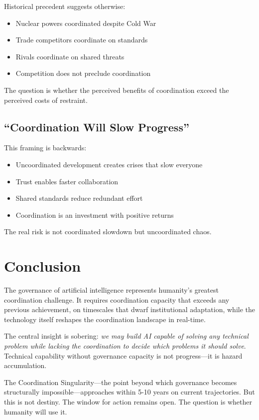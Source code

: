 \documentclass[11pt,letterpaper]{article}
\begin{document}
Historical precedent suggests otherwise:
\begin{itemize}
\item Nuclear powers coordinated despite Cold War
\item Trade competitors coordinate on standards
\item Rivals coordinate on shared threats
\item Competition does not preclude coordination
\end{itemize}

The question is whether the perceived benefits of coordination exceed the perceived costs of restraint.

\subsection{``Coordination Will Slow Progress''}

This framing is backwards:
\begin{itemize}
\item Uncoordinated development creates crises that slow everyone
\item Trust enables faster collaboration
\item Shared standards reduce redundant effort
\item Coordination is an investment with positive returns
\end{itemize}

The real risk is not coordinated slowdown but uncoordinated chaos.

\section{Conclusion}

The governance of artificial intelligence represents humanity's greatest coordination challenge. It requires coordination capacity that exceeds any previous achievement, on timescales that dwarf institutional adaptation, while the technology itself reshapes the coordination landscape in real-time.

The central insight is sobering: \emph{we may build AI capable of solving any technical problem while lacking the coordination to decide which problems it should solve}. Technical capability without governance capacity is not progress---it is hazard accumulation.

The Coordination Singularity---the point beyond which governance becomes structurally impossible---approaches within 5-10 years on current trajectories. But this is not destiny. The window for action remains open. The question is whether humanity will use it.
\end{document}
